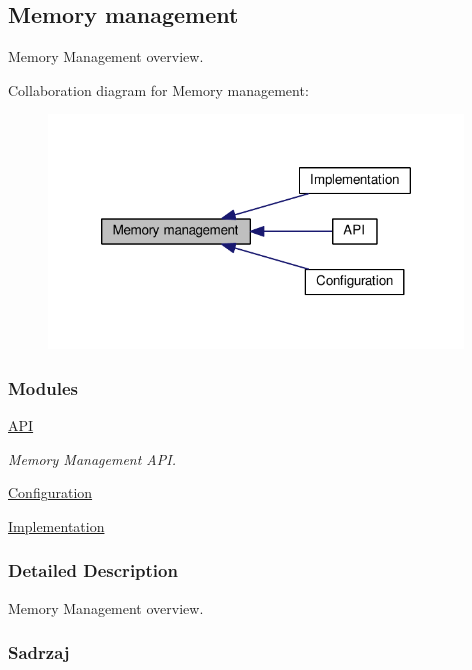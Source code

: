 \hypertarget{group__mem}{\subsection{Memory management}
\label{group__mem}
}


Memory Management overview.  


Collaboration diagram for Memory management\-:\nopagebreak
\begin{figure}[H]
\begin{center}
\leavevmode
\includegraphics[width=312pt]{group__mem}
\end{center}
\end{figure}
\subsubsection*{Modules}
\begin{DoxyCompactItemize}
\item 
\hyperlink{group__mem__intf}{A\-P\-I}
\begin{DoxyCompactList}\small\item\em Memory Management A\-P\-I. \end{DoxyCompactList}\item 
\hyperlink{group__mem__cfg}{Configuration}
\item 
\hyperlink{group__mem__impl}{Implementation}
\end{DoxyCompactItemize}


\subsubsection{Detailed Description}
Memory Management overview. \hypertarget{group__mem_mem_index}{}\subsubsection{Sadrzaj}\label{group__mem_mem_index}

